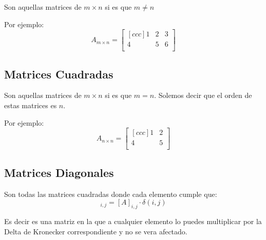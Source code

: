 \documentclass[12pt]{report}                                    %
\begin{document}
                Son aquellas matrices de $m \times n$ si es que $m \neq n$ 

                Por ejemplo: 
                \begin{equation*}
                    A_{m \times n} =
                    \begin{bmatrix}[ccc]
                        1 & 2 & 3   \\
                        4 & 5 & 6   \\
                    \end{bmatrix}
                \end{equation*}

            \subsection{Matrices Cuadradas}

                Son aquellas matrices de $m \times n$ si es que $m = n$.
                Solemos decir que el orden de estas matrices es $n$.

                Por ejemplo: 
                \begin{equation*}
                    A_{n \times n} =
                    \begin{bmatrix}[ccc]
                        1 & 2 \\
                        4 & 5 \\
                    \end{bmatrix}
                \end{equation*}

            \subsection{Matrices Diagonales}

                Son todas las matrices cuadradas donde cada elemento cumple que:
                \begin{equation}
                    [A]_{i,j} = [A]_{i,j} \cdot \delta(i,j)
                \end{equation}

                Es decir es una matriz en la que a cualquier elemento lo puedes multiplicar 
                por la Delta de Kronecker correspondiente y no se vera afectado.
\end{document}
